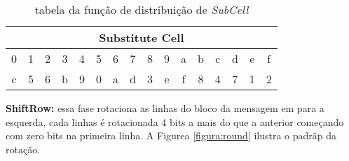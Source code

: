 \documentclass[runningheads,a4paper,11pt]{llncs}
\begin{document}
\begin{table}[htbp]
	\centering
	\caption{tabela da fun\c{c}\~ao de distribui\c{c}\~ao de \textit{SubCell}}
	\begin{tabular}{|c|c|c|c|c|c|c|c|c|c|c|c|c|c|c|c|}
		\hline
		\multicolumn{16}{|c|}{Substitute Cell}\\\hline
		\hspace{1mm}0\hspace{1mm} & \hspace{1mm}1\hspace{1mm} & \hspace{1mm}2\hspace{1mm} & \hspace{1mm}3\hspace{1mm} & \hspace{1mm}4\hspace{1mm} & \hspace{1mm}5\hspace{1mm} & \hspace{1mm}6\hspace{1mm} & \hspace{1mm}7\hspace{1mm} & \hspace{1mm}8\hspace{1mm} & \hspace{1mm}9\hspace{1mm} & \hspace{1mm}a\hspace{1mm} & \hspace{1mm}b\hspace{1mm} & \hspace{1mm}c\hspace{1mm} & \hspace{1mm}d\hspace{1mm} & \hspace{1mm}e\hspace{1mm} & \hspace{1mm}f\hspace{1mm} \\ \hline
		c & 5 & 6 & b & 9 & 0 & a & d & 3 & e & f & 8 & 4 & 7 & 1 & 2 \\ \hline
	\end{tabular}
	\label{tabela:sub}
\end{table}


\noindent\textbf{ShiftRow:} essa fase rotaciona as linhas do bloco da mensagem em para a esquerda, cada linhas \'e rotacionada 4 bits a mais do que a anterior come\c{c}ando com zero bits na primeira linha. A Figurea \ref{figura:round} ilustra o padr\~ap da rota\c{c}\~ao.
\end{document}
